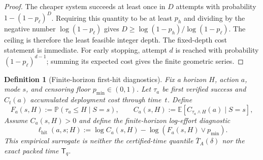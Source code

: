 \documentclass[10pt]{article}
\theoremstyle{paperplain}
\theoremstyle{paperdefinition}
\newtheorem{definition}[theorem]{Definition}
\theoremstyle{paperremark}
\newcommand{\E}{\mathbb{E}}
\newcommand{\Prb}{\mathbb{P}}
\begin{document}
\begin{proof}
The cheaper system succeeds at least once in $D$ attempts with probability
$1-(1-p_\ell)^D$.
Requiring this quantity to be at least $p_h$ and dividing by the negative number
$\log(1-p_\ell)$ gives
$D\ge\log(1-p_h)/\log(1-p_\ell)$.
The ceiling is therefore the least feasible integer depth.
The fixed-depth cost statement is immediate.
For early stopping, attempt $d$ is reached with probability $(1-p_\ell)^{d-1}$; summing its expected cost gives the finite geometric series.
\end{proof}

\begin{definition}[Finite-horizon first-hit diagnostics]
\label{def:first-hit-diagnostics}
Fix a horizon $H$, action $a$, mode $s$, and censoring floor $p_{\min}\in(0,1)$.
Let $\tau_a$ be first verified success and $C_t(a)$ accumulated deployment cost through time~$t$.
Define
\[
F_a(s,H):=\Prb(\tau_a\le H\mid S=s),
\qquad
C_a(s,H):=\E[C_{\tau_a\wedge H}(a)\mid S=s],
\]
Assume $C_a(s,H)>0$ and define the finite-horizon log-effort diagnostic
\[
\ell_{\mathrm{hit}}(a,s;H)
:=
\log C_a(s,H)-\log(F_a(s,H)\vee p_{\min}).
\]
This empirical surrogate is neither the certified-time quantile $\overline T_A(\delta)$ nor the exact packed time $\mathsf T_q$.
\end{definition}
\end{document}
